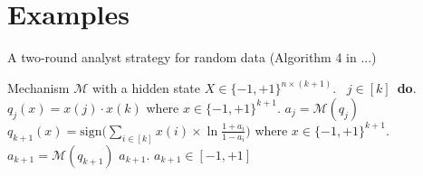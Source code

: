 \documentclass[a4paper,11pt]{article}
\theoremstyle{definition}
\begin{document}
\clearpage

\section{Examples}

\begin{algorithm}
\caption{A two-round analyst strategy for random data (Algorithm 4 in ...)}
\label{alg:BitGOF}
\begin{algorithmic}
\REQUIRE Mechanism $\mathcal{M}$ with a hidden state $X\in \{-1,+1\}^{n\times (k+1)}$.
\ $j\in [k]$\ {\bf do}.  
\STATE {} $q_j(x)=x(j)\cdot x(k)$ where $x\in \{-1,+1\}^{k+1}$.
\STATE {} $a_j=\mathcal{M}(q_j)$ 
\STATE \qquad {}
 $q_{k+1}(x)=\mathrm{sign}\big (\sum_{i\in [k]} x(i)\times\ln\frac{1+a_i}{1-a_i} \big )$ where $x\in \{-1,+1\}^{k+1}$.
\STATE{}
 $a_{k+1}=\mathcal{M}(q_{k+1})$
\STATE{}
\RETURN $a_{k+1}$.
\ENSURE $a_{k+1}\in [-1,+1]$
\end{algorithmic}
\end{algorithm}





\newpage


\end{document}
